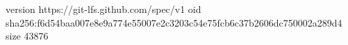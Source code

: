 version https://git-lfs.github.com/spec/v1
oid sha256:f6d54baa007e8e9a774e55007e2c3203c54e75fcb6c37b2606dc750002a289d4
size 43876
